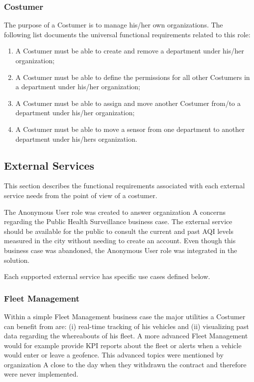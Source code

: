 \subsubsection{Costumer}
\label{subsubsec:requirements:functional:sensae:costumer}

The purpose of a Costumer is to manage his/her own organizations.
The following list documents the universal functional requirements related to this role:

\begin{enumerate}
    \item A Costumer must be able to create and remove a department under his/her organization;
    \item A Costumer must be able to define the permissions for all other Costumers in a department under his/her organization;
    \item A Costumer must be able to assign and move another Costumer from/to a department under his/her organization;
    \item A Costumer must be able to move a sensor from one department to another department under his/hers organization.
\end{enumerate}

\subsection{External Services}
\label{subsec:requirements:functional:services}

This section describes the functional requirements associated with each external service needs from the point of view of a costumer.

The Anonymous User role was created to answer organization A concerns regarding the Public Health Surveillance business case. The external service should be available for the public to consult the current and past \gls{AQI} levels measured in the city without needing to create an account. Even though this business case was abandoned, the Anonymous User role was integrated in the solution.

Each supported external service has specific use cases defined below.

\subsubsection{Fleet Management}
\label{subsubsec:requirements:functional:services:fleet}

Within a simple Fleet Management business case the major utilities a Costumer can benefit from are: (i) real-time tracking of his vehicles and (ii) visualizing past data regarding the whereabouts of his fleet. A more advanced Fleet Management would for example provide \gls{KPI} reports about the fleet or alerts when a vehicle would enter or leave a geofence. This advanced topics were mentioned by organization A close to the day when they withdrawn the contract and therefore were never implemented.

